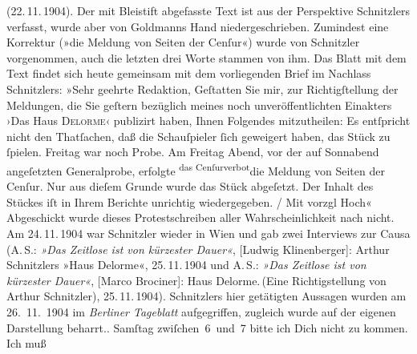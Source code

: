 {{{                     (22. 11. 1904).
                  Der mit Bleistift abgefasste Text ist aus der Perspektive Schnitzlers verfasst, wurde aber von Goldmanns Hand niedergeschrieben. Zumindest eine Korrektur
                     (»die Meldung von Seiten der Cenſur«) wurde von Schnitzler vorgenommen, auch die letzten drei Worte stammen
                  von ihm. Das Blatt mit dem Text findet sich heute gemeinsam mit dem vorliegenden
                  Brief im Nachlass Schnitzlers: »{\pb}\strikeout{\textcolor{gray}{E}{ }}Sehr geehrte Redaktion, Geſtatten Sie mir, zur Richtigſtellung der
                           Meldungen, die
                        Sie geſtern bezüglich  meines noch unveröffentlichten Einakters
                           ›Das Haus \textsc{Delorme}‹ publizirt haben, Ihnen Folgendes mitzutheilen:  Es entſpricht
                        nicht den Thatſachen, daß die Schauſpieler ſich geweigert haben,  das Stück zu ſpielen. Freitag war noch Probe.  Am Freitag{ }Abend, vor der auf Sonnabend
                        angeſetzten Generalprobe, \strikeout{\textcolor{gray}{er}} erfolgte \substVorne{}\textsuperscript{das Cenſurverbot}\substDazwischen{}die Meldung von Seiten der Cenſur\substHinten{}. Nur aus dieſem Grunde wurde das Stück abgeſetzt. Der Inhalt des Stückes iſt in  Ihrem Berichte unrichtig wiedergegeben.{ / }Mit vorzgl Hoch« Abgeschickt wurde dieses Protestschreiben aller Wahrscheinlichkeit nach
                  nicht. Am 24. 11. 1904 war Schnitzler wieder in Wien und gab zwei Interviews zur Causa (A. S.: \emph{»Das Zeitlose ist von kürzester Dauer«}, [Ludwig Klinenberger]: Arthur Schnitzlers »Haus Delorme«, 25. 11. 1904 und A. S.: \emph{»Das Zeitlose ist von kürzester Dauer«}, [Marco Brociner]: Haus Delorme. (Eine Richtigstellung von Arthur Schnitzler), 25. 11. 1904). Schnitzlers hier getätigten Aussagen wurden
                  am 26. 11. 1904 im \emph{Berliner
                     Tageblatt} aufgegriffen, zugleich wurde auf der eigenen Darstellung
                  beharrt.}}}\label{K_L03456-1}. Samſtag{ }zwiſchen 6 und 7 bitte ich Dich nicht zu kommen. Ich muß

